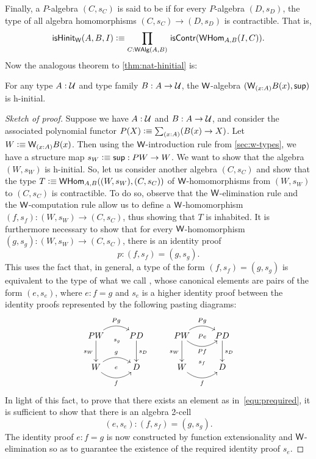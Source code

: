%
Finally, a $P$-algebra $(C, s_C)$ is said to be 
%
%
if for every $P$-algebra $(D, s_D)$, the type of all algebra homomorphisms $(C, s_C) \rightarrow (D, s_D)$ is contractible.
That is,
\begin{equation*}
\ishinitw(A,B,I) \defeq \prd{C : \walg(A,B)} \iscontr(\whom_{A,B}(I,C)).
\end{equation*}
%
Now the analogous theorem to \autoref{thm:nat-hinitial} is:

\begin{thm}\label{thm:w-hinit}
For any type $A : \mathcal{U}$ and type family $B : A \to \mathcal{U}$, the $\mathsf{W}$-algebra $(\wtype{x:A}B(x), \supp)$ is h-initial.
\end{thm}

\begin{proof}[Sketch of proof]
Suppose we have $A : \mathcal{U}$ and $B : A \to \mathcal{U}$,
and consider the associated polynomial functor $P(X)\defeq\sm{x:A}(B(x)\to X)$.
Let $W \defeq \wtype{x:A}B(x)$.  Then using
the $\mathsf{W}$-introduction rule from \autoref{sec:w-types}, we have a structure map $s_W\vcentcolon\equiv{\mathsf{sup}}: PW \rightarrow W$. 
We want to show that the algebra $(W, s_W)$ is
h-initial. So, let us consider another algebra $(C,s_C)$ and show that the type $T\vcentcolon\equiv \mathsf{W}\mathsf{Hom}_{A,B}((W, s_W),(C,s_C)) $ 
of  $\mathsf{W}$-homomorphisms from $(W, s_W)$ to $(C, s_C)$ is contractible. To do
so, observe that the $\mathsf{W}$-elimination rule and the $\mathsf{W}$-computation
rule allow us to define a $\mathsf{W}$-homomorphism $(f, s_f) : (W, s_W) \rightarrow (C, s_C)$, 
thus showing that $T$ is inhabited. It is furthermore necessary to show that for every $\mathsf{W}$-ho\-mo\-mor\-phism $(g, s_g) : (W, s_W) \rightarrow (C, s_C)$, there is an identity proof 
\begin{equation}
\label{equ:prequired}
p :  (f,s_f) = (g,s_g).
\end{equation}
This uses the fact that, in general, a type of the form $(f,s_f) = (g,s_g) $
is  equivalent to the type of what we call ,
%
whose canonical
elements are pairs of the form $(e, s_e)$, where $e : f=g$ and $s_e$ is a higher identity proof between the identity proofs represented by the following pasting diagrams:
\[
\xymatrix{
PW \ar@/^1pc/[r]^{Pg}   \ar[d]_{s_W} \ar@{}[r]_(.52){s_g}  & PD \ar[d]^{s_D}  \\
W \ar@/^1pc/[r]^g  \ar@/_1pc/[r]_f  \ar@{}[r]|{e} & D } \qquad
\xymatrix{
PW \ar@/^1pc/[r]^{Pg}   \ar[d]_{s_W}   \ar@/_1pc/[r]_{Pf} \ar@{}[r]|{Pe}
& PD \ar[d]^{s_D}  \\
W  \ar@/_1pc/[r]_f  \ar@{}[r]^{s_f} & D }
\]
In light of this fact, to prove that there exists an element as in~\eqref{equ:prequired}, it is 
sufficient to show that there is an algebra 2-cell 
\[
(e,s_e) : (f,s_f) = (g,s_g).
\]
The identity proof $e : f=g$ is now constructed by function extensionality and
$\mathsf{W}$-elimination so as to guarantee the existence of the required identity
proof $s_e$. 
\end{proof}

